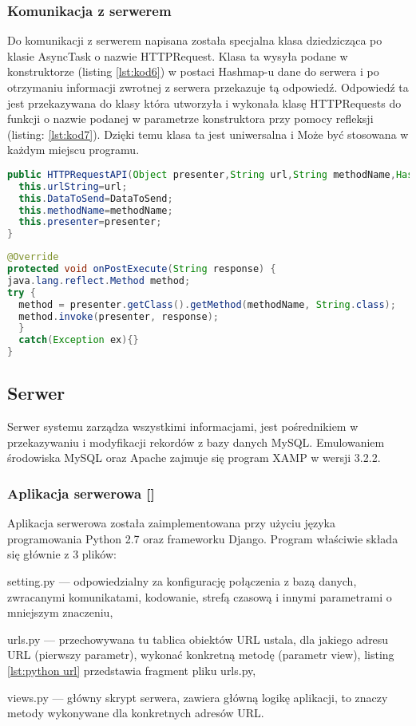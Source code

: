	\subsubsection{Komunikacja z serwerem}
	Do komunikacji z serwerem napisana została specjalna klasa dziedzicząca po klasie AsyncTask o nazwie HTTPRequest. Klasa ta wysyła podane w konstruktorze (listing \ref{lst:kod6}) w postaci Hashmap-u dane do serwera i po otrzymaniu informacji zwrotnej z serwera przekazuje tą odpowiedź. Odpowiedź ta jest przekazywana do klasy która utworzyła i wykonała klasę HTTPRequests do funkcji o nazwie podanej w parametrze konstruktora przy pomocy refleksji (listing: \ref{lst:kod7}). Dzięki temu klasa ta jest uniwersalna i Może być stosowana w każdym miejscu programu.
	
	\begin{lstlisting}[caption={Konstruktor klasy HTTPRequest.}, label={lst:kod6}, language=Java]
public HTTPRequestAPI(Object presenter,String url,String methodName,HashMap DataToSend) {
  this.urlString=url;
  this.DataToSend=DataToSend;
  this.methodName=methodName;
  this.presenter=presenter;
}
\end{lstlisting}	
	
\begin{lstlisting}[caption={Metoda OnPost zwracająca odpowied"z serwera.}, label={lst:kod7}, language=Java]
@Override
protected void onPostExecute(String response) {
java.lang.reflect.Method method;
try {
  method = presenter.getClass().getMethod(methodName, String.class);
  method.invoke(presenter, response);
  }
  catch(Exception ex){}
}
\end{lstlisting}	

\subsection{Serwer}
Serwer systemu zarządza wszystkimi informacjami, jest pośrednikiem w przekazywaniu i modyfikacji rekordów z bazy danych MySQL. Emulowaniem środowiska MySQL oraz Apache zajmuje się program XAMP w wersji 3.2.2.
 
	\subsubsection{Aplikacja serwerowa [\StudentA]}\label{sec:apk serw}
	Aplikacja serwerowa została zaimplementowana przy użyciu języka programowania Python 2.7 oraz frameworku Django. Program  właściwie składa się głównie z 3 plików:
	\begin{itemize*}
		\item setting.py --- odpowiedzialny za konfigurację połączenia z bazą danych, zwracanymi komunikatami, kodowanie, strefą czasową i innymi parametrami o mniejszym znaczeniu,
		\item urls.py --- przechowywana tu tablica obiektów URL ustala, dla jakiego adresu URL (pierwszy parametr), wykonać konkretną metodę (parametr view), listing \ref{lst:python url} przedstawia fragment pliku urls.py,
		\item views.py --- główny skrypt serwera, zawiera główną logikę aplikacji, to znaczy metody wykonywane dla konkretnych adresów URL.
	\end{itemize*}

